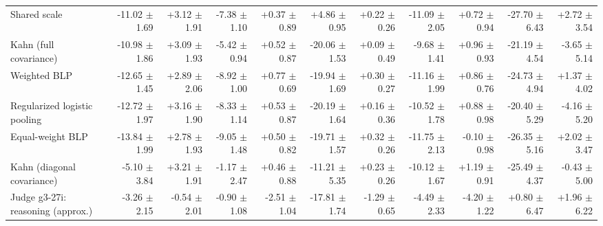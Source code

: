\begin{tabular}{lrrrrrrrrrr}
Shared scale & -11.02 {\scriptsize $\pm$ 1.69} & +3.12 {\scriptsize $\pm$ 1.91} & -7.38 {\scriptsize $\pm$ 1.10} & +0.37 {\scriptsize $\pm$ 0.89} & +4.86 {\scriptsize $\pm$ 0.95} & +0.22 {\scriptsize $\pm$ 0.26} & -11.09 {\scriptsize $\pm$ 2.05} & +0.72 {\scriptsize $\pm$ 0.94} & -27.70 {\scriptsize $\pm$ 6.43} & +2.72 {\scriptsize $\pm$ 3.54} \\
Kahn (full covariance) & -10.98 {\scriptsize $\pm$ 1.86} & +3.09 {\scriptsize $\pm$ 1.93} & -5.42 {\scriptsize $\pm$ 0.94} & +0.52 {\scriptsize $\pm$ 0.87} & -20.06 {\scriptsize $\pm$ 1.53} & +0.09 {\scriptsize $\pm$ 0.49} & -9.68 {\scriptsize $\pm$ 1.41} & +0.96 {\scriptsize $\pm$ 0.93} & -21.19 {\scriptsize $\pm$ 4.54} & -3.65 {\scriptsize $\pm$ 5.14} \\
Weighted BLP & -12.65 {\scriptsize $\pm$ 1.45} & +2.89 {\scriptsize $\pm$ 2.06} & -8.92 {\scriptsize $\pm$ 1.00} & +0.77 {\scriptsize $\pm$ 0.69} & -19.94 {\scriptsize $\pm$ 1.69} & +0.30 {\scriptsize $\pm$ 0.27} & -11.16 {\scriptsize $\pm$ 1.99} & +0.86 {\scriptsize $\pm$ 0.76} & -24.73 {\scriptsize $\pm$ 4.94} & +1.37 {\scriptsize $\pm$ 4.02} \\
Regularized logistic pooling & -12.72 {\scriptsize $\pm$ 1.97} & +3.16 {\scriptsize $\pm$ 1.90} & -8.33 {\scriptsize $\pm$ 1.14} & +0.53 {\scriptsize $\pm$ 0.87} & -20.19 {\scriptsize $\pm$ 1.64} & +0.16 {\scriptsize $\pm$ 0.36} & -10.52 {\scriptsize $\pm$ 1.78} & +0.88 {\scriptsize $\pm$ 0.98} & -20.40 {\scriptsize $\pm$ 5.29} & -4.16 {\scriptsize $\pm$ 5.20} \\
Equal-weight BLP & -13.84 {\scriptsize $\pm$ 1.99} & +2.78 {\scriptsize $\pm$ 1.93} & -9.05 {\scriptsize $\pm$ 1.48} & +0.50 {\scriptsize $\pm$ 0.82} & -19.71 {\scriptsize $\pm$ 1.57} & +0.32 {\scriptsize $\pm$ 0.26} & -11.75 {\scriptsize $\pm$ 2.13} & -0.10 {\scriptsize $\pm$ 0.98} & -26.35 {\scriptsize $\pm$ 5.16} & +2.02 {\scriptsize $\pm$ 3.47} \\
Kahn (diagonal covariance) & -5.10 {\scriptsize $\pm$ 3.84} & +3.21 {\scriptsize $\pm$ 1.91} & -1.17 {\scriptsize $\pm$ 2.47} & +0.46 {\scriptsize $\pm$ 0.88} & -11.21 {\scriptsize $\pm$ 5.35} & +0.23 {\scriptsize $\pm$ 0.26} & -10.12 {\scriptsize $\pm$ 1.67} & +1.19 {\scriptsize $\pm$ 0.91} & -25.49 {\scriptsize $\pm$ 4.37} & -0.43 {\scriptsize $\pm$ 5.00} \\
Judge g3-27i: reasoning (approx.) & -3.26 {\scriptsize $\pm$ 2.15} & -0.54 {\scriptsize $\pm$ 2.01} & -0.90 {\scriptsize $\pm$ 1.08} & -2.51 {\scriptsize $\pm$ 1.04} & -17.81 {\scriptsize $\pm$ 1.74} & -1.29 {\scriptsize $\pm$ 0.65} & -4.49 {\scriptsize $\pm$ 2.33} & -4.20 {\scriptsize $\pm$ 1.22} & +0.80 {\scriptsize $\pm$ 6.47} & +1.96 {\scriptsize $\pm$ 6.22} \\

\end{tabular}
